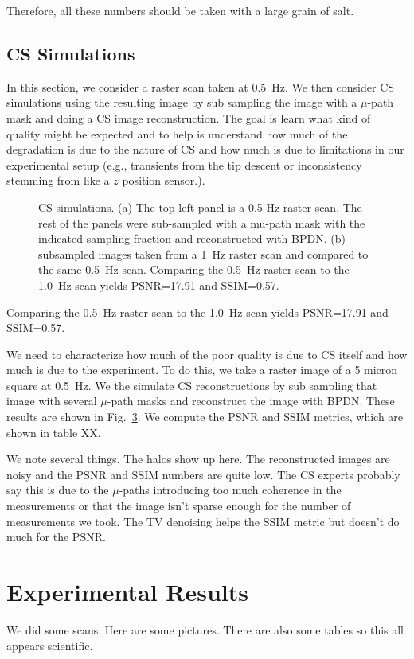 \documentclass[11pt]{article}
\begin{document}
Therefore, all these numbers should be taken with a large grain of salt.



\subsection{CS Simulations}
In this section, we consider a raster scan taken at 0.5~Hz. We then consider CS simulations using the resulting image by sub sampling the image with a $\mu$-path mask and doing a CS image reconstruction. The goal is learn what kind of quality might be expected and to help is understand how much of the degradation is due to the nature of CS and how much is due to limitations in our experimental setup (e.g., transients from the tip descent or inconsistency stemming from like a $z$ position sensor.).


\begin{figure}[h!]
  \begin{subfigure}{1\textwidth}
      
  \caption{}
  \label{fig:cs_sim_0p5}
  \end{subfigure}
  \begin{subfigure}{1\textwidth}
    
    \caption{}
    \label{fig:cs_sim_raster_0p5_1p0}
  \end{subfigure}
  \caption{CS simulations. (a) The top left panel is a 0.5 Hz raster scan. The rest of the panels were sub-sampled with a mu-path mask with the indicated sampling fraction and reconstructed with BPDN. (b) subsampled images taken from a 1~Hz raster scan and compared to the same 0.5~Hz scan. Comparing the 0.5~Hz raster scan to the 1.0~Hz scan yields PSNR=17.91 and SSIM=0.57.}
  \label{fig:cs_sim_against_raster}
\end{figure}

Comparing the 0.5~Hz raster scan to the 1.0~Hz scan yields PSNR=17.91 and SSIM=0.57.

We need to characterize how much of the poor quality is due to CS itself and how much is due to the experiment. To do this, we take a raster image of a 5 micron square at 0.5~Hz. We the simulate CS reconstructions by sub sampling that image with several $\mu$-path masks and reconstruct the image with BPDN. These results are shown in Fig.~\ref{fig:cs_sim_against_raster}. We compute the PSNR and SSIM metrics, which are shown in table XX.

We note several things. The halos show up here. The reconstructed images are noisy and the PSNR and SSIM numbers are quite low. The CS experts probably say this is due to the $\mu$-paths introducing too much coherence in the measurements or that the image isn't sparse enough for the number of measurements we took. The TV denoising helps the SSIM metric but doesn't do much for the PSNR.

\section{Experimental Results}
We did some scans. Here are some pictures. There are also some tables so this all appears scientific.



\end{document}
